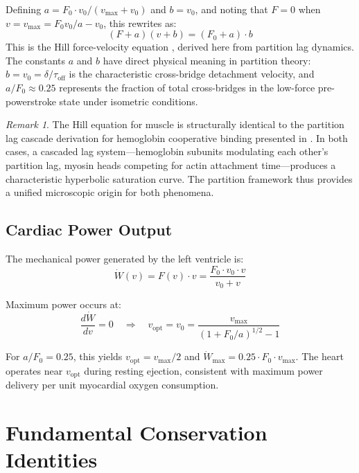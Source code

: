 \documentclass[12pt,a4paper]{article}
\theoremstyle{remark}
\newtheorem{remark}[theorem]{Remark}
\begin{document}
Defining $a = F_0 \cdot v_0 / (v_{\max} + v_0)$ and $b = v_0$, and noting that $F = 0$ when $v = v_{\max} = F_0 v_0/a - v_0$, this rewrites as:
\begin{equation}
    \boxed{(F + a)(v + b) = (F_0 + a) \cdot b}
    \label{eq:hill}
\end{equation}
This is the Hill force-velocity equation \cite{hill1938heat}, derived here from partition lag dynamics. The constants $a$ and $b$ have direct physical meaning in partition theory: $b = v_0 = \delta/\tau_{\mathrm{off}}$ is the characteristic cross-bridge detachment velocity, and $a/F_0 \approx 0.25$ represents the fraction of total cross-bridges in the low-force pre-powerstroke state under isometric conditions.

\begin{remark}
    The Hill equation for muscle is structurally identical to the partition lag cascade derivation for hemoglobin cooperative binding presented in \cite{sachikonye2024cardio}. In both cases, a cascaded lag system—hemoglobin subunits modulating each other's partition lag, myosin heads competing for actin attachment time—produces a characteristic hyperbolic saturation curve. The partition framework thus provides a unified microscopic origin for both phenomena.
\end{remark}

\subsection{Cardiac Power Output}

The mechanical power generated by the left ventricle is:
\begin{equation}
    \dot{W}(v) = F(v) \cdot v = \frac{F_0 \cdot v_0 \cdot v}{v_0 + v}
\end{equation}

Maximum power occurs at:
\begin{equation}
    \frac{d\dot{W}}{dv} = 0 \quad\Rightarrow\quad v_{\mathrm{opt}} = v_0 = \frac{v_{\max}}{(1 + F_0/a)^{1/2} - 1}
\end{equation}

For $a/F_0 = 0.25$, this yields $v_{\mathrm{opt}} = v_{\max}/2$ and $\dot{W}_{\max} = 0.25 \cdot F_0 \cdot v_{\max}$. The heart operates near $v_{\mathrm{opt}}$ during resting ejection, consistent with maximum power delivery per unit myocardial oxygen consumption.

\section{Fundamental Conservation Identities}
\label{sec:conservation}
\end{document}

